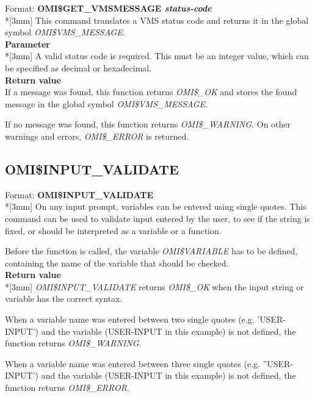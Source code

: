 \documentclass[a4paper]{book}
\newcommand{\vs}{\vspace{3mm}}
\renewcommand{\indent}{\hspace*{5mm}}
\begin{document}
\indent Format: \textbf{OMI{\$}GET{\_}VMSMESSAGE \textit{status-code}}\\*[3mm]
This command translates a VMS status code and returns it in the global 
symbol \textsl{OMI{\$}VMS{\_}MESSAGE}.\\[3mm]
\textbf{Parameter}\\*[3mm]
A valid status code is required. This must be an integer value, which can be 
specified as decimal or hexadecimal. \\[3mm]
\textbf{Return value}\\[3mm]
If a message was found, this function returns \textsl{OMI{\$}{\_}OK} and stores the 
found message in the global symbol \textsl{OMI{\$}VMS{\_}MESSAGE}.

If no message was found, this function returns \textsl{OMI{\$}{\_}WARNING}. On other 
warnings and errors, \textsl{OMI{\$}{\_}ERROR} is returned.

\subsection{OMI{\$}INPUT{\_}VALIDATE}
\label{subsubsec:mylabel56}

\indent Format: \textbf{OMI{\$}INPUT{\_}VALIDATE}\\*[3mm]
On any input prompt, variables can be entered using single quotes. This 
command can be used to validate input entered by the user, to see if the 
string is fixed, or should be interpreted as a variable or a function.

\vs

Before the function is called, the variable \textsl{OMI{\$}VARIABLE} has to be 
defined, containing the name of the variable that should be checked.\\[3mm]
\textbf{Return value}\\*[3mm]
\textsl{OMI{\$}INPUT{\_}VALIDATE} returns \textsl{OMI{\$}{\_}OK} when the input 
string or variable has the correct syntax.

When a variable name was entered between two single quotes (e.g. 'USER-INPUT') 
and the variable (USER-INPUT in this example) is not defined, the function 
returns \textsl{OMI{\$}{\_}WARNING}.

When a variable name was entered between three single quotes (e.g. ''USER-INPUT') 
and the variable (USER-INPUT in this example) is not defined, the function 
returns \textsl{OMI{\$}{\_}ERROR}.
\end{document}
